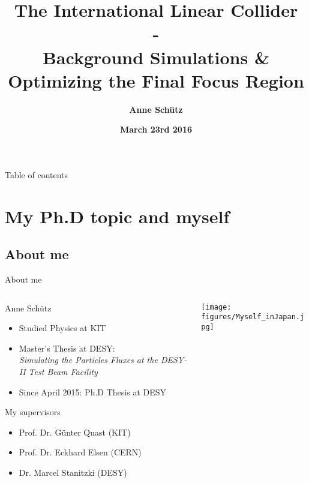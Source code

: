 \documentclass[xcolor={dvipsnames}]{beamer}
\title[ILC \& Background Simulations]{\textbf{\LARGE The International Linear Collider \\ \normalsize- \\ \small Background Simulations \& Optimizing the Final Focus Region}}
\author{\textbf{Anne Sch\"utz}}
\institute{\textbf{KIT, DESY}}
\date{\textbf{March 23rd 2016}}
\begin{document}
{
\begin{frame}
  \titlepage
\end{frame}
}

\begin{frame}{Table of contents}
\begin{multicols}{2}
  \tableofcontents
\end{multicols}
\end{frame}


\section{My Ph.D topic and myself}
\subsection{About me}

\begin{frame}{About me}
\begin{columns}
\begin{column}[T]{0.6\textwidth}
Anne Sch\"utz\\
\begin{itemize}
\item Studied Physics at KIT
\item Master's Thesis at DESY: \\ \textit{Simulating the Particles Fluxes at the DESY-II Test Beam Facility}
\item Since April 2015: Ph.D Thesis at DESY
\end{itemize}
\vspace*{0.7cm}
My supervisors\\
\begin{itemize}
\item Prof. Dr. G\"unter Quast (KIT)
\item Prof. Dr. Eckhard Elsen (CERN)
\item Dr. Marcel Stanitzki (DESY)
\end{itemize}
\end{column}

\begin{column}[T]{0.35\textwidth}
\vspace{0pt}%
\centering
	\texttt{[image: figures/Myself\_inJapan.jpg]}
\end{column}
\end{columns}

\end{frame}
\end{document}
